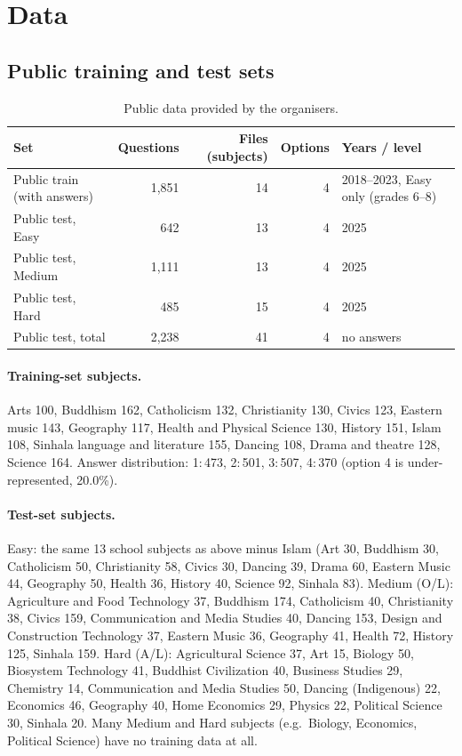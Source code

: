 \documentclass[10pt,a4paper]{article}
\begin{document}
\section{Data}\label{sec:data}
\subsection{Public training and test sets}
\begin{table}[h]
\centering\small
\begin{tabular}{lrrrl}
\toprule
Set & Questions & Files (subjects) & Options & Years / level\\
\midrule
Public train (with answers) & 1,851 & 14 & 4 & 2018--2023, Easy only (grades 6--8)\\
Public test, Easy & 642 & 13 & 4 & 2025\\
Public test, Medium & 1,111 & 13 & 4 & 2025\\
Public test, Hard & 485 & 15 & 4 & 2025\\
\midrule
Public test, total & 2,238 & 41 & 4 & no answers\\
\bottomrule
\end{tabular}
\caption{Public data provided by the organisers.}
\end{table}

\paragraph{Training-set subjects.} Arts 100, Buddhism 162, Catholicism 132, Christianity 130, Civics 123, Eastern music
143, Geography 117, Health and Physical Science 130, History 151, Islam 108, Sinhala language and literature 155,
Dancing 108, Drama and theatre 128, Science 164. Answer distribution: 1:\,473, 2:\,501, 3:\,507, 4:\,370 (option 4 is
under-represented, 20.0\%).

\paragraph{Test-set subjects.} Easy: the same 13 school subjects as above minus Islam (Art 30, Buddhism 30,
Catholicism 50, Christianity 58, Civics 30, Dancing 39, Drama 60, Eastern Music 44, Geography 50, Health 36,
History 40, Science 92, Sinhala 83). Medium (O/L): Agriculture and Food Technology 37, Buddhism 174, Catholicism 40,
Christianity 38, Civics 159, Communication and Media Studies 40, Dancing 153, Design and Construction Technology 37,
Eastern Music 36, Geography 41, Health 72, History 125, Sinhala 159. Hard (A/L): Agricultural Science 37, Art 15,
Biology 50, Biosystem Technology 41, Buddhist Civilization 40, Business Studies 29, Chemistry 14, Communication and Media
Studies 50, Dancing (Indigenous) 22, Economics 46, Geography 40, Home Economics 29, Physics 22, Political Science 30,
Sinhala 20. Many Medium and Hard subjects (e.g.\ Biology, Economics, Political Science) have no training data at all.
\end{document}
